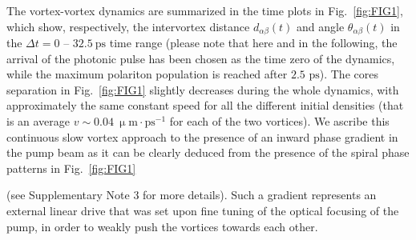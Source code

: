 \documentclass[aps,prb,twocolumn,superscriptaddress,nofootinbib]{revtex4}
\def\editr#1{#1}
\def\refer#1{#1}
\def\edstrike#1{}
\begin{document}
The vortex-vortex dynamics are summarized in the time plots
in Fig.~\ref{fig:FIG1}, which
show, respectively, the intervortex distance $d_{\alpha\beta}(t)$ and
angle $\theta_{\alpha\beta}(t)$ in the $\Delta t = 0 \text{ -- } 32.5~\text{ps}$ time range
\refer{(please note that here and in the following,
the arrival of the photonic pulse
has been chosen as the time zero of the dynamics, 
while the maximum polariton population is reached after $2.5 \text{ ps}$)}.
%
The cores separation in Fig.~\ref{fig:FIG1} slightly decreases during the whole dynamics,
with approximately the same constant speed for all the different initial densities
 (that is an average $v \sim 0.04~\upmu \text{m} \cdot \text{ps}^{-1}$ for each of the two vortices).
%
We ascribe this continuous slow vortex approach to the presence of an
inward phase gradient in the pump beam
as it can be clearly \edstrike{observed from} \editr{deduced from the presence of} the spiral phase patterns in Fig.~\ref{fig:FIG1}
%
\edstrike{We label this slow inward drift as driving action I} 
\editr{(see Supplementary Note 3 for more details)}.
%
Such a gradient represents an external linear drive that
was set upon fine tuning of the optical focusing of the pump,
in order to weakly push the vortices towards each other.\\
%
\end{document}
